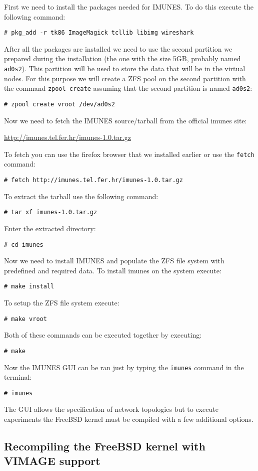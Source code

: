 First we need to install the packages needed for IMUNES. To do this execute the
following command:

\texttt{\# pkg\_add -r tk86 ImageMagick tcllib libimg wireshark}

After all the packages are installed we need to use the second partition we
prepared during the installation (the one with the size 5GB, probably named
\texttt{ad0s2}). This partition will be used to store the data that will be in
the virtual nodes. For this purpose we will create a ZFS pool on the second
partition with the command \texttt{zpool create} assuming that the second
partition is named \texttt{ad0s2}:

\texttt{\# zpool create vroot /dev/ad0s2}

Now we need to fetch the IMUNES source/tarball from the official imunes site:

\begin{center}
\url{http://imunes.tel.fer.hr/imunes-1.0.tar.gz}
\end{center}

To fetch you can use the firefox browser that we installed earlier or use the
\texttt{fetch} command:

\texttt{\# fetch http://imunes.tel.fer.hr/imunes-1.0.tar.gz}

To extract the tarball use the following command:

\texttt{\# tar xf imunes-1.0.tar.gz}

Enter the extracted directory:

\texttt{\# cd imunes}

Now we need to install IMUNES and populate the ZFS file system with predefined
and required data. To install imunes on the system execute:

\texttt{\# make install}

To setup the ZFS file system execute:

\texttt{\# make vroot}

Both of these commands can be executed together by executing:

\texttt{\# make}

Now the IMUNES GUI can be ran just by typing the \texttt{imunes} command in the
terminal:

\texttt{\# imunes}

The GUI allows the specification of network topologies but to execute
experiments the FreeBSD kernel must be compiled with a few additional options.

\subsection{Recompiling the FreeBSD kernel with VIMAGE support}

